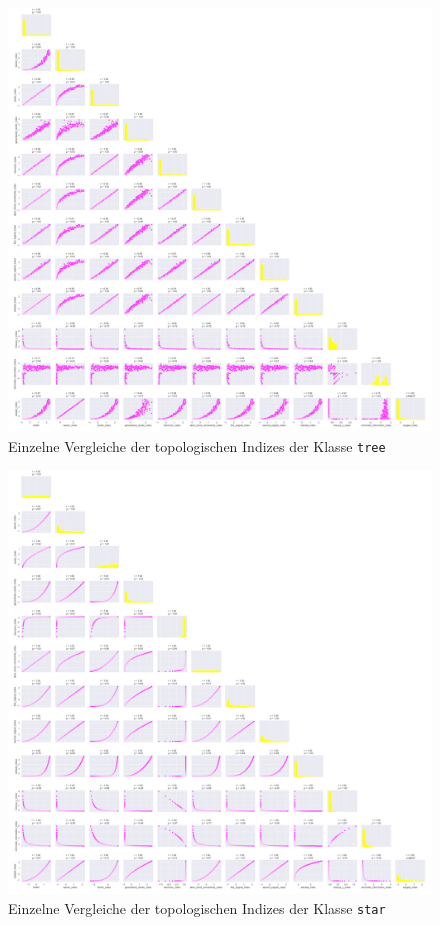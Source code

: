 \begin{figure}[H]
    \centering
    \includegraphics[width=1.2\textwidth]{images/30_results/tree-correlation-pairs.png}
    \caption{Einzelne Vergleiche der topologischen Indizes der Klasse \texttt{tree}}
    \label{fig:correlation-pairs-tree}
\end{figure}

\begin{figure}[H]
    \centering
    \includegraphics[width=1.2\textwidth]{images/30_results/star-correlation-pairs.png}
    \caption{Einzelne Vergleiche der topologischen Indizes der Klasse \texttt{star}}
    \label{fig:correlation-pairs-star}
\end{figure}

